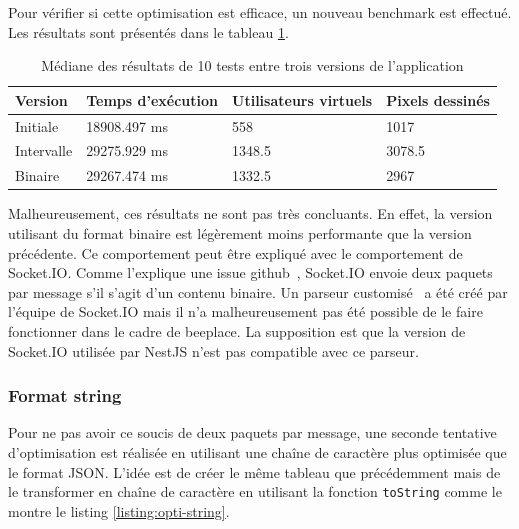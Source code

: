 Pour vérifier si cette optimisation est efficace, un nouveau benchmark est effectué. Les résultats sont présentés dans le tableau \ref{table:second-opti-results}.

\begin{table}[H]
  \centering
  \begin{tabular}{|l|l|l|l|}
    \hline
    \textbf{Version} & \textbf{Temps d'exécution} & \textbf{Utilisateurs virtuels} & \textbf{Pixels dessinés} \\ \hline
    Initiale         & 18908.497 ms               & 558                            & 1017                     \\ \hline
    Intervalle       & 29275.929 ms               & 1348.5                         & 3078.5                   \\ \hline
    Binaire          & 29267.474 ms               & 1332.5                         & 2967                     \\ \hline
  \end{tabular}
  \caption{Médiane des résultats de 10 tests entre trois versions de l'application}
  \label{table:second-opti-results}
\end{table}

Malheureusement, ces résultats ne sont pas très concluants. En effet, la version utilisant du format binaire est légèrement moins performante que la version précédente. Ce comportement peut être expliqué avec le comportement de Socket.IO. Comme l'explique une issue \gls{github}~\cite{socket-io-binary-issue}, Socket.IO envoie deux paquets par message s'il s'agit d'un contenu binaire. Un parseur customisé~\cite{socket-io-msgpack-parser} a été créé par l'équipe de Socket.IO mais il n'a malheureusement pas été possible de le faire fonctionner dans le cadre de \gls{beeplace}. La supposition est que la version de Socket.IO utilisée par NestJS n'est pas compatible avec ce parseur.

\subsubsection{Format string}

Pour ne pas avoir ce soucis de deux paquets par message, une seconde tentative d'optimisation est réalisée en utilisant une chaîne de caractère plus optimisée que le format JSON. L'idée est de créer le même tableau que précédemment mais de le transformer en chaîne de caractère en utilisant la fonction \texttt{toString} comme le montre le listing \ref{listing:opti-string}.

